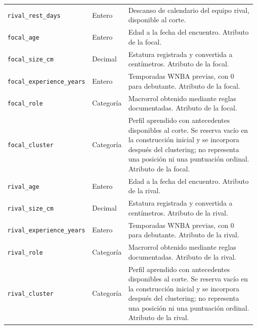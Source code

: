 \begin{longtable}{@{}>{\raggedright\arraybackslash}p{5.0cm}>{\raggedright\arraybackslash}p{1.9cm}>{\raggedright\arraybackslash}p{7.7cm}@{}}
\texttt{rival\_\allowbreak rest\_\allowbreak days} & Entero & Descanso de calendario del equipo rival, disponible al corte.\\
\texttt{focal\_\allowbreak age} & Entero & Edad a la fecha del encuentro. Atributo de la focal.\\
\texttt{focal\_\allowbreak size\_\allowbreak cm} & Decimal & Estatura registrada y convertida a centímetros. Atributo de la focal.\\
\texttt{focal\_\allowbreak experience\_\allowbreak years} & Entero & Temporadas WNBA previas, con 0 para debutante. Atributo de la focal.\\
\texttt{focal\_\allowbreak role} & Categoría & Macrorrol obtenido mediante reglas documentadas. Atributo de la focal.\\
\texttt{focal\_\allowbreak cluster} & Categoría & Perfil aprendido con antecedentes disponibles al corte. Se reserva vacío en la construcción inicial y se incorpora después del clustering; no representa una posición ni una puntuación ordinal. Atributo de la focal.\\
\texttt{rival\_\allowbreak age} & Entero & Edad a la fecha del encuentro. Atributo de la rival.\\
\texttt{rival\_\allowbreak size\_\allowbreak cm} & Decimal & Estatura registrada y convertida a centímetros. Atributo de la rival.\\
\texttt{rival\_\allowbreak experience\_\allowbreak years} & Entero & Temporadas WNBA previas, con 0 para debutante. Atributo de la rival.\\
\texttt{rival\_\allowbreak role} & Categoría & Macrorrol obtenido mediante reglas documentadas. Atributo de la rival.\\
\texttt{rival\_\allowbreak cluster} & Categoría & Perfil aprendido con antecedentes disponibles al corte. Se reserva vacío en la construcción inicial y se incorpora después del clustering; no representa una posición ni una puntuación ordinal. Atributo de la rival.\\
\end{longtable}
\endgroup

